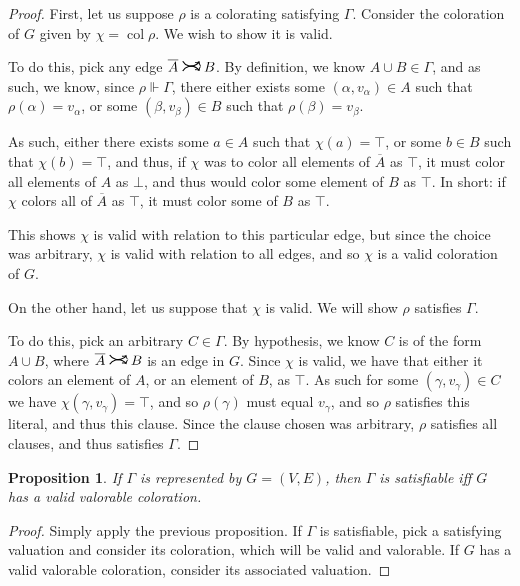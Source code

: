 \documentclass[11pt]{article}
\newcommand{\conj}[1]{\overline{#1}}
\newcommand{\sat}{\Vdash}
\DeclareMathOperator{\col}{col}
\newcommand{\rightcurvearrow}{
\mathrel{
  \begin{tikzpicture}[scale=0.8]
    \draw[thick,->] (0,1ex) arc (30:150:-2ex);
    \draw[thick,->] (0,-1ex) arc (150:30:2ex);
  \end{tikzpicture}
}
}
\newtheorem{prop}{Proposition}
\begin{document}
\begin{proof}
First, let us suppose $\rho$ is a colorating satisfying $\Gamma$. Consider the coloration of $G$ given by $\chi = \col \rho$. We wish to show it is valid.

To do this, pick any edge $\conj A \rightcurvearrow B$. By definition, we know $A \cup B \in \Gamma$, and as such, we know, since $\rho \sat \Gamma$, there either exists some $(\alpha, v_\alpha) \in A$ such that $\rho(\alpha) = v_\alpha$, or some $(\beta, v_\beta) \in B$ such that $\rho(\beta) = v_\beta$.

As such, either there exists some $a \in A$ such that $\chi(a) = \top$, or some $b \in B$ such that $\chi(b) = \top$, and thus, if $\chi$ was to color all elements of $\conj A$ as $\top$, it must color all elements of $A$ as $\bot$, and thus would color some element of $B$ as $\top$. In short: if $\chi$ colors all of $\conj A$ as $\top$, it must color some of $B$ as $\top$.

This shows $\chi$ is valid with relation to this particular edge, but since the choice was arbitrary, $\chi$ is valid with relation to all edges, and so $\chi$ is a valid coloration of $G$.

On the other hand, let us suppose that $\chi$ is valid. We will show $\rho$ satisfies $\Gamma$.

To do this, pick an arbitrary $C \in \Gamma$. By hypothesis, we know $C$ is of the form $A \cup B$, where $\conj A \rightcurvearrow B$ is an edge in $G$. Since $\chi$ is valid, we have that either it colors an element of $A$, or an element of $B$, as $\top$. As such for some $(\gamma, v_\gamma) \in C$ we have $\chi(\gamma, v_\gamma) = \top$, and so $\rho(\gamma)$ must equal $v_\gamma$, and so $\rho$ satisfies this literal, and thus this clause. Since the clause chosen was arbitrary, $\rho$ satisfies all clauses, and thus satisfies $\Gamma$.
\end{proof}

\begin{prop}
If $\Gamma$ is represented by $G = (V,E)$, then $\Gamma$ is satisfiable iff $G$ has a valid valorable coloration.
\end{prop}

\begin{proof}
Simply apply the previous proposition. If $\Gamma$ is satisfiable, pick a satisfying valuation and consider its coloration, which will be valid and valorable. If $G$ has a valid valorable coloration, consider its associated valuation.
\end{proof}
\end{document}
